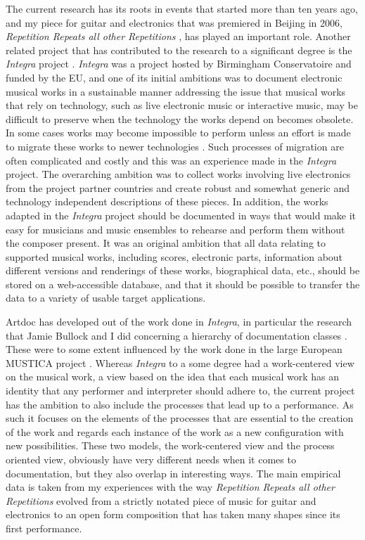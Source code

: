 \documentclass[,a4paper]{llncs}
\begin{document}
The current research has its roots in events that started more than ten years ago, and my piece for guitar and electronics that was premiered in Beijing in 2006, \emph{Repetition Repeats all other Repetitions} \cite{friskcoessens2013}, has played an important role. Another related project that has contributed to the research to a significant degree is the \emph{Integra} project \cite{integra}. \emph{Integra} was a project hosted by Birmingham Conservatoire and funded by the EU, and one of its initial ambitions was to document electronic musical works in a sustainable manner addressing the issue that musical works that rely on technology, such as live electronic music or interactive music, may be difficult to preserve when the technology the works depend on becomes obsolete. In some cases works may become impossible to perform unless an effort is made to migrate these works to newer technologies \cite{frisk-bullock08,frisk-bull07,bullock06}. Such processes of migration are often complicated and costly and this was an experience made in the \emph{Integra} project. The overarching ambition was to collect works involving live electronics from the project partner countries and create robust and somewhat generic and technology independent descriptions of these pieces. In addition, the works adapted in the \emph{Integra} project should be documented in ways that would make it easy for musicians and music ensembles to rehearse and perform them without the composer present. It was an original ambition that all data relating to supported musical works, including scores, electronic parts, information about different versions and renderings of these works, biographical data, etc., should be stored on a web-accessible database, and that it should be possible to transfer the data to a variety of usable target applications.

Artdoc has developed out of the work done in \emph{Integra}, in particular the research that Jamie Bullock and I did concerning a hierarchy of documentation classes \cite{frisk09,frisk-bullock08}. These were to some extent influenced by the work done in the large European MUSTICA project \cite{Bachimont2003}. Whereas \emph{Integra} to a some degree had a work-centered view on the musical work, a view based on the idea that each musical work has an identity that any performer and interpreter should adhere to, the current project has the ambition to also include the processes that lead up to a performance. As such it focuses on the elements of the processes that are essential to the creation of the work and regards each instance of the work as a new configuration with new possibilities. These two models, the work-centered view and the process oriented view, obviously have very different needs when it comes to documentation, but they also overlap in interesting ways. The main empirical data is taken from my experiences with the way \emph{Repetition Repeats all other Repetitions} evolved from a strictly notated piece of music for guitar and electronics to an open form composition that has taken many shapes since its first performance.
\end{document}

